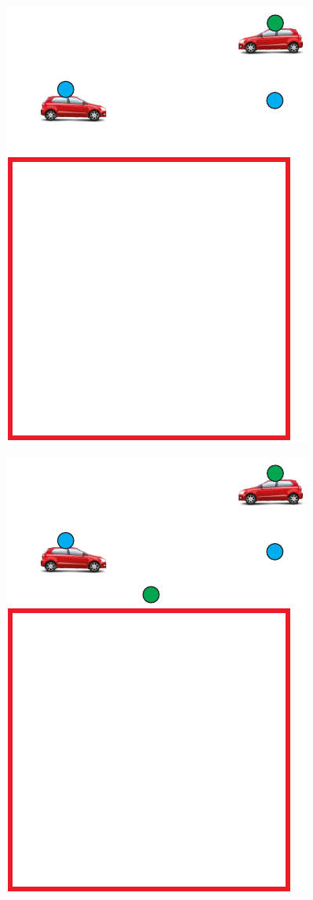 \begin{figure}[htbp]
\begin{minipage}{0.30\textwidth}
		\includegraphics[scale=0.5]{metodologia/figuras/destinoVeiculoSelecionadoDentroRA.pdf}
		\label{fig:destinoVeiculoSelecionadoDentroRA}
	\end{minipage}
	\begin{minipage}{0.30\textwidth}
		\centering
		\includegraphics[scale=0.5]{metodologia/figuras/destinoVeiculoSelecionadoProximoRA.pdf}
		\label{fig:destinoVeiculoSelecionadoProximoRA}
	\end{minipage}
\end{figure}

